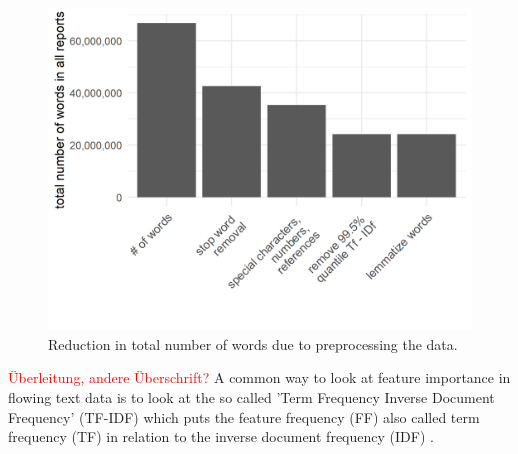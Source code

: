 \begin{figure}[h]
\centering
\includegraphics[width=\textwidth]{figures/ReductionInTotalNWords.png}
\caption{Reduction in total number of words due to preprocessing the data.}
\label{fig:TotWord}
\end{figure}
\textcolor{red}{Überleitung, andere Überschrift?}
A common way to look at feature importance in flowing text data is to look at the so called 'Term Frequency Inverse Document Frequency' (TF-IDF) which puts the feature frequency (FF) also called term frequency (TF) in relation to the inverse document frequency (IDF) \citep{na2004effectiveness}. 
